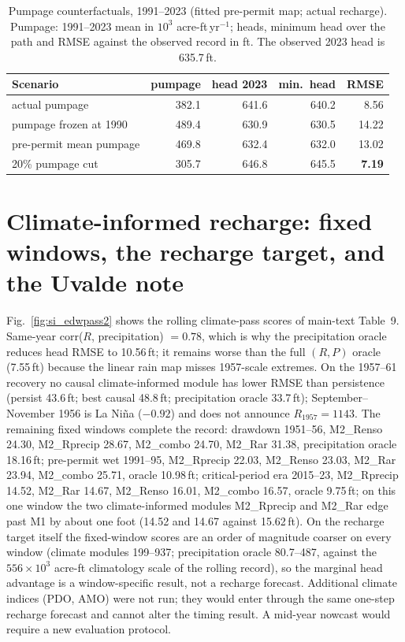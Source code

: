 \begin{table}[!htb]
\centering\small
\caption{Pumpage counterfactuals, 1991--2023 (fitted pre-permit map; actual recharge). Pumpage: 1991--2023 mean in $10^3$ acre-ft\,yr$^{-1}$; heads, minimum head over the path and RMSE against the observed record in ft. The observed 2023 head is 635.7\,ft.}
\label{tab:si_pumpage}
\begin{tabular}{@{}lrrrr@{}}
\toprule
Scenario & pumpage & head 2023 & min.\ head & RMSE \\
\midrule
actual pumpage & 382.1 & 641.6 & 640.2 & 8.56 \\
pumpage frozen at 1990 & 489.4 & 630.9 & 630.5 & 14.22 \\
pre-permit mean pumpage & 469.8 & 632.4 & 632.0 & 13.02 \\
20\% pumpage cut & 305.7 & 646.8 & 645.5 & \textbf{7.19} \\
\bottomrule
\end{tabular}
\end{table}

\FloatBarrier
\section{Climate-informed recharge: fixed windows, the recharge target, and the Uvalde note}\label{si:edwclimate}

Fig.~\ref{fig:si_edwpass2} shows the rolling climate-pass scores of main-text Table~9. Same-year corr($R$, precipitation) $=0.78$, which is why the precipitation oracle reduces head RMSE to 10.56\,ft; it remains worse than the full $(R,P)$ oracle (7.55\,ft) because the linear rain map misses 1957-scale extremes. On the 1957--61 recovery no causal climate-informed module has lower RMSE than persistence (persist 43.6\,ft; best causal 48.8\,ft; precipitation oracle 33.7\,ft); September--November 1956 is La Ni\~na ($-0.92$) and does not announce $R_{1957}=1143$. The remaining fixed windows complete the record: drawdown 1951--56, M2\_Renso 24.30, M2\_Rprecip 28.67, M2\_combo 24.70, M2\_Rar 31.38, precipitation oracle 18.16\,ft; pre-permit wet 1991--95, M2\_Rprecip 22.03, M2\_Renso 23.03, M2\_Rar 23.94, M2\_combo 25.71, oracle 10.98\,ft; critical-period era 2015--23, M2\_Rprecip 14.52, M2\_Rar 14.67, M2\_Renso 16.01, M2\_combo 16.57, oracle 9.75\,ft; on this one window the two climate-informed modules M2\_Rprecip and M2\_Rar edge past M1 by about one foot (14.52 and 14.67 against 15.62\,ft). On the recharge target itself the fixed-window scores are an order of magnitude coarser on every window (climate modules 199--937; precipitation oracle 80.7--487, against the $556\times10^3$ acre-ft climatology scale of the rolling record), so the marginal head advantage is a window-specific result, not a recharge forecast. Additional climate indices (PDO, AMO) were not run; they would enter through the same one-step recharge forecast and cannot alter the timing result. A mid-year nowcast would require a new evaluation protocol.

